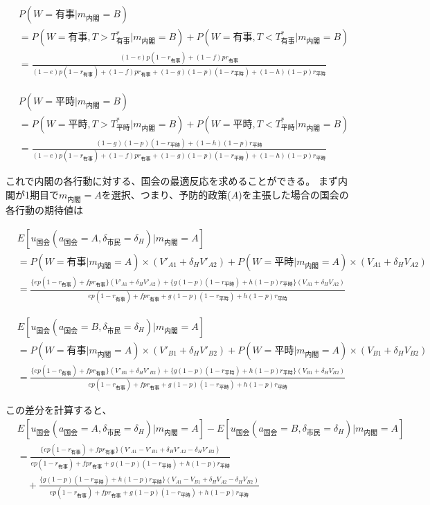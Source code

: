 \documentclass[main.tex]{subfiles}
\begin{document}
\begin{align*}
    & P(W=有事 | m_{内閣}=B)\\[0.5em]
    &= P(W=有事, T>T^*_{有事} | m_{内閣}=B) + P(W=有事, T<T^*_{有事} | m_{内閣}=B)\\[0.5em]
    &= \frac{ (1-e)p(1-r_{有事}) +  (1-f)pr_{有事} }{ (1-e)p(1-r_{有事}) + (1-f)pr_{有事} + (1-g)(1-p)(1-r_{平時}) + (1-h)(1-p)r_{平時} }
\end{align*}

\begin{align*}
    & P(W=平時 | m_{内閣}=B)\\[0.5em]
    &= P(W=平時, T>T^*_{平時} | m_{内閣}=B) + P(W=平時, T<T^*_{平時} | m_{内閣}=B)\\[0.5em]
    &= \frac{ (1-g)(1-p)(1-r_{平時}) + (1-h)(1-p)r_{平時} }{ (1-e)p(1-r_{有事}) + (1-f)pr_{有事} + (1-g)(1-p)(1-r_{平時}) + (1-h)(1-p)r_{平時} }
\end{align*}

\bigskip
これで内閣の各行動に対する、国会の最適反応を求めることができる。
まず内閣が1期目で$m_{内閣}=A$を選択、つまり、予防的政策($A$)を主張した場合の国会の各行動の期待値は

\begin{align*}
    & E[u_{国会}(a_{国会}=A, \delta_{市民}=\delta_H) | m_{内閣} = A  ]\\[0.5em]
    &= P(W=有事 | m_{内閣}=A) × (V'_{A1} + \delta_H V'_{A2}) + P(W=平時 | m_{内閣}=A) × (V_{A1} + \delta_H V_{A2})\\[0.5em]
    &= \frac{ \{ep(1-r_{有事}) +  fpr_{有事}\}(V'_{A1} + \delta_H V'_{A2}) +  \{g(1-p)(1-r_{平時}) + h(1-p)r_{平時}\}(V_{A1} + \delta_H V_{A2})  }{ ep(1-r_{有事}) + fpr_{有事} + g(1-p)(1-r_{平時}) + h(1-p)r_{平時} }
\end{align*}

\begin{align*}
    & E[u_{国会}(a_{国会}=B, \delta_{市民}=\delta_H) | m_{内閣} = A  ]\\[0.5em]
    &= P(W=有事 | m_{内閣}=A) × (V'_{B1} + \delta_H V'_{B2}) + P(W=平時 | m_{内閣}=A) × (V_{B1} + \delta_H V_{B2})\\[0.5em]
    &= \frac{ \{ep(1-r_{有事}) +  fpr_{有事}\}(V'_{B1} + \delta_H V'_{B2}) +  \{g(1-p)(1-r_{平時}) + h(1-p)r_{平時}\}(V_{B1} + \delta_H V_{B2})  }{ ep(1-r_{有事}) + fpr_{有事} + g(1-p)(1-r_{平時}) + h(1-p)r_{平時} }
\end{align*}

\bigskip
この差分を計算すると、
\begin{align*}
    & E[u_{国会}(a_{国会}=A, \delta_{市民}=\delta_H) | m_{内閣} = A  ] - E[u_{国会}(a_{国会}=B, \delta_{市民}=\delta_H) | m_{内閣} = A  ]\\[1em]
    &= \frac{ \{ep(1-r_{有事}) +  fpr_{有事}\}(V'_{A1} -V'_{B1} + \delta_H V'_{A2} - \delta_H V'_{B2})  }{ ep(1-r_{有事}) + fpr_{有事} + g(1-p)(1-r_{平時}) + h(1-p)r_{平時} }\\[1em]
    &\quad + \frac{ \{g(1-p)(1-r_{平時}) + h(1-p)r_{平時}\}(V_{A1} - V_{B1} + \delta_H V_{A2} - \delta_H V_{B2} ) }{ ep(1-r_{有事}) + fpr_{有事} + g(1-p)(1-r_{平時}) + h(1-p)r_{平時} }
\end{align*}
\end{document}
